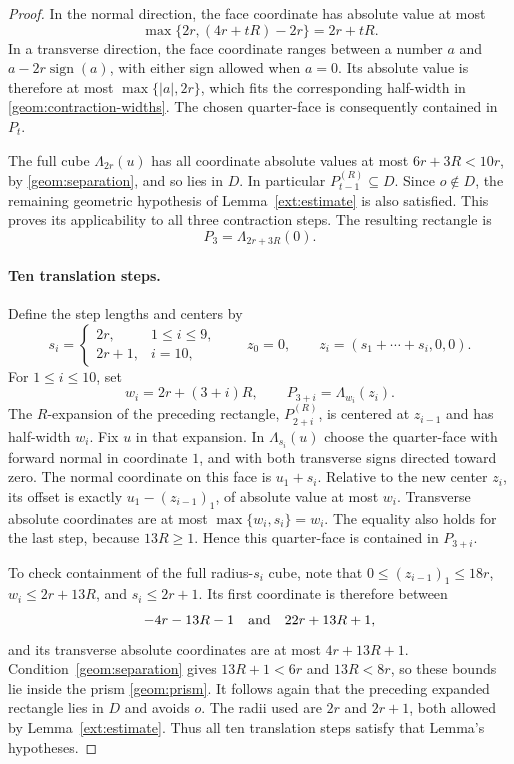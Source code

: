 \documentclass[11pt]{article}
\theoremstyle{definition}
\theoremstyle{remark}
\numberwithin{equation}{section}
\begin{document}
\begin{proof}
In the normal direction, the face coordinate has absolute value at most
\[
  \max\{2r,(4r+tR)-2r\}=2r+tR.
\]
In a transverse direction, the face coordinate ranges between a number $a$
and $a-2r\operatorname{sign}(a)$, with either sign allowed when $a=0$.
Its absolute value is therefore at most $\max\{|a|,2r\}$, which fits the
corresponding half-width in \eqref{geom:contraction-widths}. The chosen
quarter-face is consequently contained in $P_t$.

The full cube $\Lambda_{2r}(u)$ has all coordinate absolute values at most
$6r+3R<10r$, by \eqref{geom:separation}, and so lies in $D$. In particular
$P_{t-1}^{(R)}\subseteq D$. Since $o\notin D$, the remaining geometric
hypothesis of Lemma~\ref{ext:estimate} is also satisfied. This proves its
applicability to all three contraction steps. The resulting rectangle is
\begin{equation}\label{geom:contracted}
  P_3=\Lambda_{2r+3R}(0).
\end{equation}

\paragraph{Ten translation steps.}
Define the step lengths and centers by
\begin{equation}\label{geom:translations}
  s_i=\begin{cases}2r,&1\le i\le9,\\2r+1,&i=10,\end{cases}
  \qquad
  z_0=0,\qquad z_i=(s_1+\cdots+s_i,0,0).
\end{equation}
For $1\le i\le10$, set
\begin{equation}\label{geom:translated-boxes}
  w_i=2r+(3+i)R,\qquad P_{3+i}=\Lambda_{w_i}(z_i).
\end{equation}
The $R$-expansion of the preceding rectangle, $P_{2+i}^{(R)}$, is centered
at $z_{i-1}$ and has half-width $w_i$. Fix $u$ in that expansion. In
$\Lambda_{s_i}(u)$ choose the quarter-face with forward normal in coordinate
$1$, and with both transverse signs directed toward zero. The normal
coordinate on this face is $u_1+s_i$. Relative to the new center $z_i$, its
offset is exactly $u_1-(z_{i-1})_1$, of absolute value at most $w_i$.
Transverse absolute coordinates are at most
$\max\{w_i,s_i\}=w_i$. The equality also holds for the last step, because
$13R\ge1$. Hence this quarter-face is contained in $P_{3+i}$.

To check containment of the full radius-$s_i$ cube, note that
$0\le(z_{i-1})_1\le18r$, $w_i\le2r+13R$, and $s_i\le2r+1$. Its first
coordinate is therefore between
\begin{equation}\label{geom:translation-bounds}
  -4r-13R-1\quad\hbox{and}\quad22r+13R+1,
\end{equation}
and its transverse absolute coordinates are at most $4r+13R+1$.
Condition~\eqref{geom:separation} gives $13R+1<6r$ and $13R<8r$, so these
bounds lie inside the prism \eqref{geom:prism}. It follows again that the
preceding expanded rectangle lies in $D$ and avoids $o$. The radii used
are $2r$ and $2r+1$, both allowed by Lemma~\ref{ext:estimate}. Thus all ten
translation steps satisfy that Lemma's hypotheses.


\end{proof}
\end{document}
